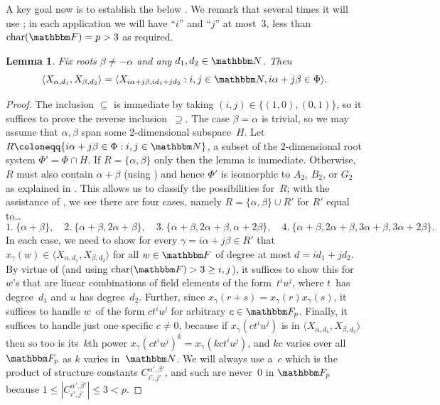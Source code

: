 \documentclass[10pt,a4paper]{article}
\newtheorem{lemma}[theorem]{Lemma}
\theoremstyle{definition}
\newcommand{\N}{\mathbbm N}
\newcommand{\F}{\mathbbm F}
\begin{document}
A key goal now is to establish the below .  We remark that several times it will use ; in each application we will have ``$i$'' and ``$j$'' at most~$3$, less than $\mathrm{char}(\F) = p > 3$ as required.
\begin{lemma}\label{rk2gen}
    Fix roots $\beta \neq -\alpha$  and any $d_1,d_2 \in \N$. Then
    \[
        \langle X_{\alpha,d_1},X_{\beta,d_2} \rangle= \langle X_{i\alpha + j\beta,id_1+jd_2}  : i,j \in \N, i\alpha+j\beta \in \Phi \rangle.  
    \]
\end{lemma}
\begin{proof}
    The inclusion $\subseteq$ is immediate by taking $(i,j) \in \{(1,0), (0,1)\}$, so it suffices to prove the reverse inclusion~$\supseteq$.
    The case $\beta = \alpha$ is trivial, so we may assume that $\alpha, \beta$ span some $2$-dimensional subspace~$H$.
    Let $R \coloneqq \{i\alpha + j\beta \in \Phi : i,j \in \N\}$, a subset of the $2$-dimensional root system $\Phi' = \Phi \cap H$.
    If $R = \{\alpha,\beta\}$ only then the lemma is immediate. 
    Otherwise, $R$ must also contain $\alpha + \beta$ (using ) and hence $\Phi'$ is isomorphic to $A_2$, $B_2$, or $G_2$ as explained in .
    This allows us to classify the possibilities for~$R$; 
    with the assistance of , we see there are four cases, namely $R = \{\alpha,\beta\} \cup R'$ for $R'$ equal to\dots
    \[
        1.\ \{\alpha+\beta\}, \quad 
        2.\ \{\alpha+\beta, 2\alpha+\beta\}, \quad
        3.\ \{\alpha+\beta, 2\alpha+\beta,\alpha+2\beta\}, \quad
        4.\ \{\alpha+\beta, 2\alpha+\beta, 3\alpha+\beta, 3\alpha +2\beta\}.
    \]
    In each case, we need to show for every $\gamma =i\alpha + j\beta \in R'$ that $x_{\gamma}(w) \in \langle X_{\alpha,d_1}, X_{\beta,d_2}\rangle$ for all $w \in \F$ of degree at most $d = id_1 + jd_2$.  By virtue of  (and using $\mathrm{char}(\F) > 3 \geq i,j$), it suffices to show this for~$w$'s that are linear combinations of field elements of the form~$t^iu^j$, where $t$~has degree~$d_1$ and $u$ has degree~$d_2$.  Further, since $x_\gamma(r+s) = x_\gamma(r)x_\gamma(s)$, it suffices to handle $w$~of the form $c t^i u^j$ for arbitrary $c \in \F_p$.  Finally, it suffices to handle just one specific $c \neq 0$, because if $x_\gamma(c t^i u^j)$ is in $\langle X_{\alpha,d_1}, X_{\beta,d_2}\rangle$ then so too is its~$k$th power $x_\gamma(c t^i u^j)^k = x_\gamma(kc t^i u^j)$, and $kc$ varies over all $\F_p$ as $k$ varies in~$\N$.  We will always use a~$c$ which is the product of structure constants $C^{\alpha',\beta'}_{i',j'}$, and such are never~$0$ in $\F_p$ because $1 \leq |C^{\alpha',\beta'}_{i',j'}| \leq 3  < p$.
    

\end{proof}
\end{document}
